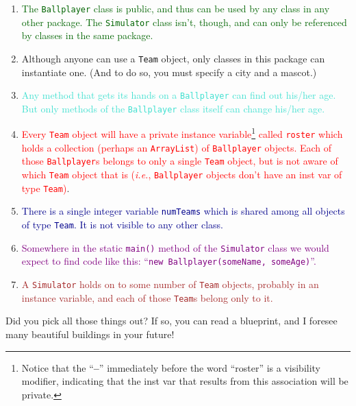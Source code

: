 \begin{enumerate}
\itemsep.1em

\item \textcolor{darkgreen}{The \texttt{Ballplayer} class is public, and thus
can be used by any class in any other package. The \texttt{Simulator} class
isn't, though, and can only be referenced by classes in the same package.}

\item \textcolor{BurntOrange}{Although anyone can use a \texttt{Team} object,
only classes in this package can instantiate one. (And to do so, you must
specify a city and a mascot.)} 

\item \textcolor{Turquoise}{Any method that gets its hands on a
\texttt{Ballplayer} can find out his/her age. But only methods of the
\texttt{Ballplayer} class itself can change his/her age.}

\pagebreak
\item \textcolor{Red}{Every \texttt{Team} object will have a private instance
variable\footnote{Notice that the ``\textbf{--}'' immediately before the word
``roster'' is a visibility modifier, indicating that the inst var that results
from this association will be private.} called \texttt{roster} which holds a collection (perhaps an
\texttt{ArrayList}) of \texttt{Ballplayer} objects. Each of those
\texttt{Ballplayer}s belongs to only a single \texttt{Team} object, but is not
aware of which \texttt{Team} object that is (\textit{i.e.},
\texttt{Ballplayer} objects don't have an inst var of type \texttt{Team})}.

\item \textcolor{darkblue}{There is a single integer variable \texttt{numTeams}
which is shared among all objects of type \texttt{Team}. It is not visible to
any other class.}

\item \textcolor{Purple}{Somewhere in the static \texttt{main()} method of the
\texttt{Simulator} class we would expect to find code like this: ``\texttt{new
Ballplayer(someName, someAge)}''.}

\item \textcolor{Brown}{A \texttt{Simulator} holds on to some number of
\texttt{Team} objects, probably in an instance variable, and each of those
\texttt{Team}s belong only to it.}

\end{enumerate}

Did you pick all those things out? If so, you can read a blueprint, and I
foresee many beautiful buildings in your future!
